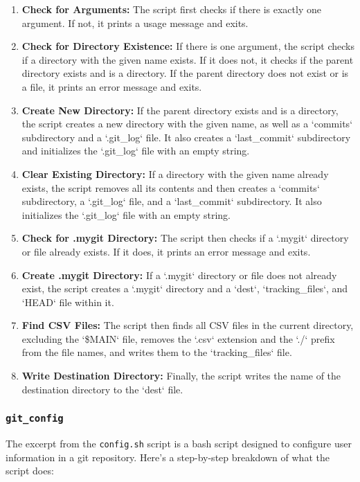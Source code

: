 \documentclass{article}
\begin{document}
\begin{enumerate}
    \item \textbf{Check for Arguments:} The script first checks if there is exactly one argument. If not, it prints a usage message and exits.
    
    \item \textbf{Check for Directory Existence:} If there is one argument, the script checks if a directory with the given name exists. If it does not, it checks if the parent directory exists and is a directory. If the parent directory does not exist or is a file, it prints an error message and exits.
    
    \item \textbf{Create New Directory:} If the parent directory exists and is a directory, the script creates a new directory with the given name, as well as a `commits` subdirectory and a `.git\_log` file. It also creates a `last\_commit` subdirectory and initializes the `.git\_log` file with an empty string.
    
    \item \textbf{Clear Existing Directory:} If a directory with the given name already exists, the script removes all its contents and then creates a `commits` subdirectory, a `.git\_log` file, and a `last\_commit` subdirectory. It also initializes the `.git\_log` file with an empty string.
    
    \item \textbf{Check for .mygit Directory:} The script then checks if a `.mygit` directory or file already exists. If it does, it prints an error message and exits.
    
    \item \textbf{Create .mygit Directory:} If a `.mygit` directory or file does not already exist, the script creates a `.mygit` directory and a `dest`, `tracking\_files`, and `HEAD` file within it.
    
    \item \textbf{Find CSV Files:} The script then finds all CSV files in the current directory, excluding the `\$MAIN` file, removes the `.csv` extension and the `./` prefix from the file names, and writes them to the `tracking\_files` file.
    
    \item \textbf{Write Destination Directory:} Finally, the script writes the name of the destination directory to the `dest` file.
\end{enumerate}

\subsubsection{\texttt{git\_config}}
The excerpt from the \texttt{config.sh} script is a bash script designed to configure user information in a git repository. Here's a step-by-step breakdown of what the script does:
\end{document}

